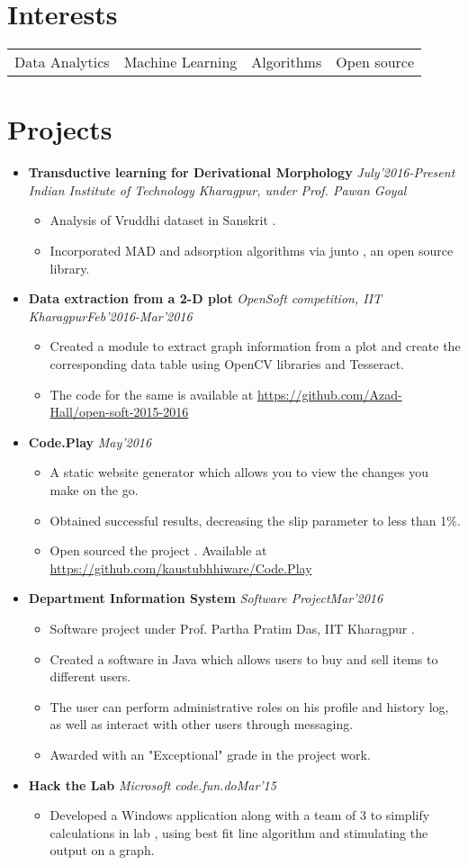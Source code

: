 \documentclass[11pt,a4paper]{moderncv}
\newcommand{\experience}[4]{
  \vspace{0.1cm}
\item \textbf{\large{#1}} \textit{#2}\hfill\textit{#3}
  \begin{itemize}[leftmargin=*]
    \setlength\itemsep{0em} #4
  \end{itemize}
}
\newcommand{\experiencetwo}[4]{
  \vspace{0.1cm}
\item \textbf{\large{#1}} \hfill\textit{#3}\\\textit{#2}
  \begin{itemize}[leftmargin=*]
    \setlength\itemsep{0em} #4
  \end{itemize}
}
\begin{document}
\section*{Interests}
\begin{tabular}{L{4cm} L{4cm} L{3.4cm} l}
 Data Analytics & Machine Learning & Algorithms & Open source \\
\end{tabular}

\vspace{-0.1cm}
\section*{Projects}
\begin{itemize}
  \setlength\itemsep{0.5em}

  \experiencetwo{Transductive learning for Derivational Morphology}{Indian Institute of Technology Kharagpur, under Prof. Pawan Goyal}{July'2016-Present}{
   \item Analysis of Vruddhi dataset in Sanskrit .
   \item Incorporated MAD and adsorption algorithms via junto , an open source library.
  }

  \experience{Data extraction from a 2-D plot}{OpenSoft competition, IIT Kharagpur}{Feb'2016-Mar'2016}{
  \item Created a module to extract graph information from a plot and create the corresponding data table using OpenCV libraries and Tesseract.
  \item The code for the same is available at \url{https://github.com/Azad-Hall/open-soft-2015-2016}
  }
  
  \experiencetwo{Code.Play}{}{May'2016}{
  \item A static website generator which allows you to view the changes you make on the go.
  \item Obtained successful results, decreasing the slip parameter to less
    than 1\%.  
  \item Open sourced the project . Available at \url{https://github.com/kaustubhhiware/Code.Play}
  }

  \experience{Department Information System}{Software Project}{Mar'2016}{
  \item Software project under Prof. Partha Pratim Das, IIT Kharagpur .
  \item Created a software in Java which allows users to buy and sell items to different users.
  \item The user can perform administrative roles on his profile and history log, as well as interact with other users through messaging.
  \item Awarded with an "Exceptional" grade in the project work.
  }

  \experience{Hack the Lab}{Microsoft code.fun.do}{Mar'15}{
  \item   Developed a Windows application along  with a team of 3 to simplify calculations in lab , using best fit line algorithm and stimulating the output on a graph.
  }

\end{itemize}
\end{document}
